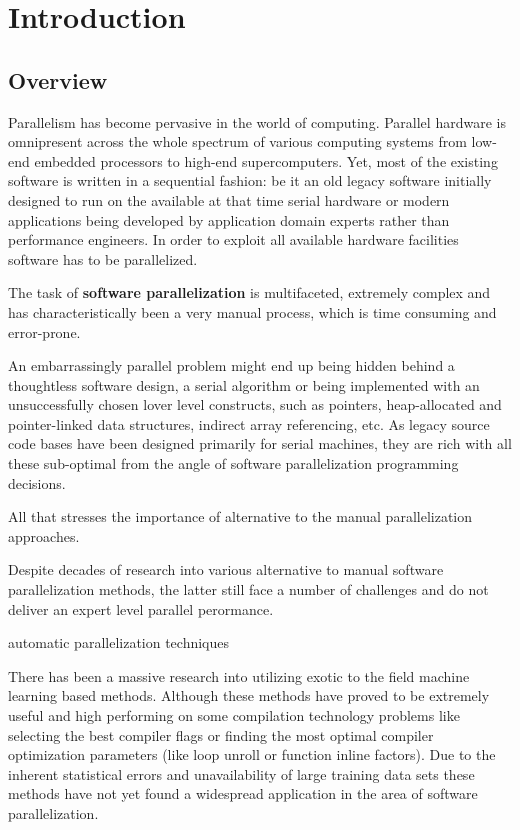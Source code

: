 \chapter{Introduction}
\label{introduction}

\section{Overview}
\label{introduction_overview}

\quad Parallelism has become pervasive in the world of computing. Parallel hardware is omnipresent across the whole spectrum of various computing systems from low-end embedded processors to high-end supercomputers. Yet, most of the existing software is written in a sequential fashion: be it an old legacy software initially designed to run on the available at that time serial hardware or modern applications being developed by application domain experts rather than performance engineers. In order to exploit all available hardware facilities software has to be parallelized.\newline\null

\quad The task of \textbf{software parallelization} is multifaceted, extremely complex and has characteristically been a very manual process, which is time consuming and error-prone.

An embarrassingly parallel problem might end up being hidden behind a thoughtless software design, a serial algorithm or being implemented with an unsuccessfully chosen lover level constructs, such as pointers, heap-allocated and pointer-linked data structures, indirect array referencing, etc. As legacy source code bases have been designed primarily for serial machines, they are rich with all these sub-optimal from the angle of software parallelization programming decisions.

All that stresses the importance of alternative to the manual parallelization approaches.




Despite decades of research into various alternative to manual software parallelization methods, the latter still face a number of challenges and do not deliver an expert level parallel perormance. 

automatic parallelization techniques 


There has been a massive research into utilizing exotic to the field machine learning based methods. Although these methods have proved to be extremely useful and high performing on some compilation technology problems like selecting the best compiler flags or finding the most optimal compiler optimization parameters (like loop unroll or function inline factors). Due to the inherent statistical errors and unavailability of large training data sets these methods have not yet found a widespread application in the area of software parallelization. 





